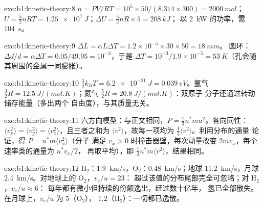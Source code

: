 \begin{solution}{exo:b1:kinetic-theory:8}
$n = PV/RT = 10^5 \times 50/(8.314 \times 300) = \qty{2000}{mol}$；$U = \tfrac52
nRT = \qty{1.25e7}{J}$；$\Delta U = \tfrac52 nR \times 5 = \qty{208}{kJ}$；
以 \qty{2}{kW} 的功率，需 \qty{104}{s}。
\end{solution}

\begin{solution}{exo:b1:kinetic-theory:9}
$\Delta L = \alpha L\Delta T = 1.2\times10^{-5} \times 30 \times 50 = \qty{18}{mm}$。
圆环：$\Delta d/d = \alpha\Delta T = 0.05/49.95 = 10^{-3}$，于是 $\Delta T = 10^{-3}/
1.9\times10^{-5} = \qty{53}{K}$（孔会随其周围的金属一同膨胀）。
\end{solution}

\begin{solution}{exo:b1:kinetic-theory:10}
$\tfrac32 k_BT = \qty{6.2e-21}{J} = \qty{0.039}{eV}$。氩气 $\tfrac32 R =
\qty{12.5}{J/(mol.K)}$；氮气 $\tfrac52 R = \qty{20.8}{J/(mol.K)}$：双原子
分子还通过转动储存能量（多出两个
自由度），与其质量无关。
\end{solution}

\begin{solution}{exo:b1:kinetic-theory:11}
六方向模型：与正文相同，$P = \tfrac13 n^*mu^2$。各向同性：
$\langle v_x^2\rangle = \langle v_y^2\rangle = \langle v_z^2\rangle$，且三者之和为
$\langle v^2\rangle$，故每一项均为 $\tfrac13\langle v^2\rangle$。利用分布的通量
论证，得 $P = n^*m\langle v_x^2\rangle$（分子
满足 $v_x > 0$ 时撞击器壁，每次动量改变 $2mv_x$，每个速率类的通量为 $n^*v_x/2$，
再取平均），即 $\tfrac13 n^*m\langle v^2\rangle$，结果相同。
\end{solution}

\begin{solution}{exo:b1:kinetic-theory:12}
H$_2$：\qty{1.9}{km/s}，O$_2$：\qty{0.48}{km/s}；地球 \qty{11.2}{km/s}，月球
\qty{2.4}{km/s}。对地球上的 O$_2$，$v_e/u = 23$：
超过该值的分布尾部完全可忽略；对 H$_2$，$v_e/u \approx 6$：
每年都有微小但持续的份额逸出，经过数十亿年，
氢已全部散失。在月球上，$v_e/u$ 为 $5$（O$_2$），
$1.2$（H$_2$）：一切都已逸散。
\end{solution}

